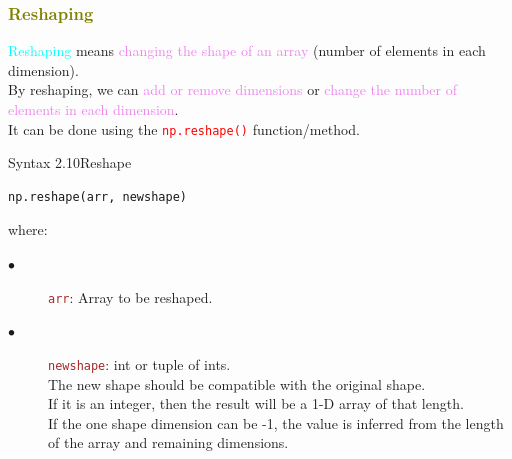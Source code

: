 \documentclass{book}
\begin{document}
\newpage
\textcolor{olive}{\subsubsection{Reshaping}}
\textcolor{cyan}{Reshaping} means \textcolor{violet}{changing the shape of an array} (number of elements in each dimension).\\
By reshaping, we can \textcolor{violet}{add or remove dimensions} or \textcolor{violet}{change the number of elements in each dimension}.\\
It can be done using the \textcolor{red}{\texttt{np.reshape()}} function/method.
\begin{synBox}{Syntax 2.10}{Reshape}
    \begin{lstlisting}[language=Python, basicstyle=\ttfamily\small, keywordstyle=\color{blue}, commentstyle=\color{forestgreen}, stringstyle=\color{red}, showstringspaces=false]
                                    np.reshape(arr, newshape)
    \end{lstlisting}
    \raggedright
    where:\\
    \begin{description}
        \item[$\bullet$] \textcolor{brown}{\texttt{arr}}: Array to be reshaped.
        \item[$\bullet$] \textcolor{brown}{\texttt{newshape}}: int or tuple of ints.\\
        The new shape should be compatible with the original shape.\\
        If it is an integer, then the result will be a 1-D array of that length.\\
        If the one shape dimension can be -1, the value is inferred from the length of the array and remaining dimensions.
    \end{description}
\end{synBox}
\end{document}
